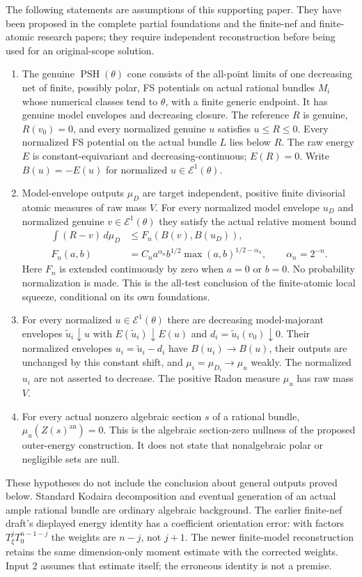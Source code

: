 \documentclass[11pt]{article}
\newcommand{\PSH}{\operatorname{PSH}}
\newcommand{\Eone}{\mathcal E^1}
\newcommand{\an}{\mathrm{an}}
\begin{document}
The following statements are assumptions of this supporting paper.
They have been proposed in the complete partial foundations and the
finite-nef and finite-atomic research papers; they require independent
reconstruction before being used for an original-scope solution.
\begin{enumerate}
\item The genuine $\PSH(\theta)$ cone consists of the all-point
limits of one decreasing net of finite, possibly polar, FS potentials
on actual rational bundles $M_i$ whose numerical classes tend to
$\theta$, with a finite generic endpoint. It has genuine model
envelopes and decreasing closure. The reference $R$ is genuine,
$R(v_0)=0$, and every normalized genuine $u$ satisfies $u\leq R\leq0$.
Every normalized FS potential on the actual bundle $L$ lies below $R$.
The raw energy $E$ is constant-equivariant and decreasing-continuous;
$E(R)=0$. Write $B(u)=-E(u)$ for normalized $u\in\Eone(\theta)$.
\item Model-envelope outputs $\mu_D$ are target independent, positive
finite divisorial atomic measures of raw mass $V$. For every normalized
model envelope $u_D$ and normalized genuine $v\in\Eone(\theta)$ they
satisfy the actual relative moment bound
\begin{align}
 \int(R-v)\,d\mu_D&\leq F_n(B(v),B(u_D)),\label{atomic}\tag{A}\\
 F_n(a,b)&=C_n a^{\alpha_n}b^{1/2}
                  \max(a,b)^{1/2-\alpha_n},\qquad\alpha_n=2^{-n}.
 \nonumber
\end{align}
Here $F_n$ is extended continuously by zero when $a=0$ or $b=0$.
No probability normalization is made. This is the all-test conclusion
of the finite-atomic local squeeze, conditional on its own foundations.
\item For every normalized $u\in\Eone(\theta)$ there are decreasing
model-majorant envelopes $\widetilde u_i\downarrow u$ with
$E(\widetilde u_i)\downarrow E(u)$ and
$d_i=\widetilde u_i(v_0)\downarrow0$. Their normalized envelopes
$u_i=\widetilde u_i-d_i$ have $B(u_i)\to B(u)$, their outputs are
unchanged by this constant shift, and
$\mu_i=\mu_{D_i}\to\mu_u$ weakly. The normalized $u_i$ are not asserted
to decrease. The positive Radon measure $\mu_u$ has raw mass $V$.
\item For every actual nonzero algebraic section $s$ of a rational
bundle, $\mu_u(Z(s)^\an)=0$. This is the algebraic section-zero
nullness of the proposed outer-energy construction. It does not state
that nonalgebraic polar or negligible sets are null.
\end{enumerate}
These hypotheses do not include the conclusion about general outputs
proved below. Standard Kodaira decomposition and eventual generation
of an actual ample rational bundle are ordinary algebraic background.
The earlier finite-nef draft's displayed energy identity has a coefficient
orientation error: with factors $T_\xi^jT_0^{n-1-j}$ the weights are
$n-j$, not $j+1$. The newer finite-model reconstruction retains the
same dimension-only moment estimate with the corrected weights.
Input 2 assumes that estimate itself; the erroneous identity is not a premise.
\end{document}
